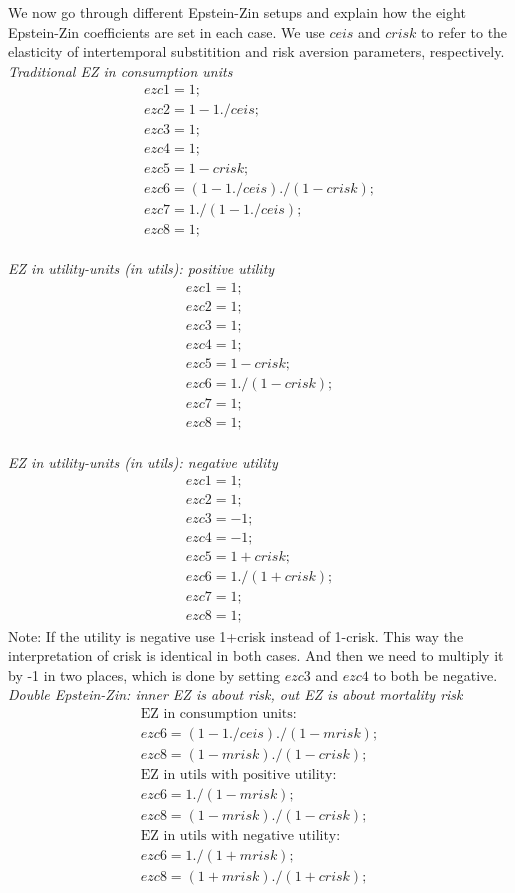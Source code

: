 We now go through different Epstein-Zin setups and explain how the eight Epstein-Zin coefficients are set in each case. We use $ceis$ and $crisk$ to refer to the elasticity of intertemporal substitition and risk aversion parameters, respectively.
\\ \noindent \textit {Traditional EZ in consumption units}
\begin{eqnarray*}
ezc1=1; \\
ezc2=1-1./ceis; \\
ezc3=1; \\
ezc4=1; \\
ezc5=1-crisk; \\
ezc6=(1-1./ceis)./(1-crisk); \\
ezc7=1./(1-1./ceis); \\
ezc8=1;
\end{eqnarray*}
\\ \noindent \textit{EZ in utility-units (in utils): positive utility}
\begin{eqnarray*}
 ezc1=1; \\
 ezc2=1; \\
 ezc3=1; \\
 ezc4=1; \\
 ezc5=1-crisk; \\
 ezc6=1./(1-crisk); \\
 ezc7=1; \\
 ezc8=1;
\end{eqnarray*}
\\ \noindent \textit{EZ in utility-units (in utils): negative utility}
\begin{eqnarray*}
 ezc1=1; \\
 ezc2=1; \\
 ezc3=-1; \\
 ezc4=-1; \\
 ezc5=1+crisk; \\
 ezc6=1./(1+crisk); \\
 ezc7=1; \\
 ezc8=1;
\end{eqnarray*}
Note: If the utility is negative use 1+crisk instead of 1-crisk. This way the interpretation of crisk is identical in both cases. And then we need to multiply it by -1 in two places, which is done by setting $ezc3$ and $ezc4$ to both be negative.
\\ \noindent \textit{Double Epstein-Zin: inner EZ is about risk, out EZ is about mortality risk}
\begin{eqnarray*}
\text{EZ in consumption units:} \\
    ezc6=(1-1./ceis)./(1-mrisk); \\
    ezc8=(1-mrisk)./(1-crisk); \\
\text{EZ in utils with positive utility: } \\
    ezc6=1./(1-mrisk); \\
    ezc8=(1-mrisk)./(1-crisk); \\
\text{EZ in utils with negative utility: } \\
    ezc6=1./(1+mrisk); \\
    ezc8=(1+mrisk)./(1+crisk);
\end{eqnarray*}
